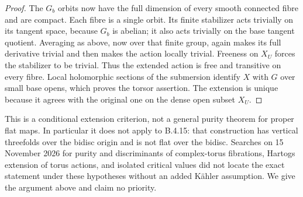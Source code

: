 \begin{proof}
The $G_b$ orbits now have the full dimension of every smooth
connected fibre and are compact.  Each fibre is a single
orbit.  Its finite stabilizer acts trivially on its tangent
space, because $G_b$ is abelian; it also acts trivially on
the base tangent quotient.  Averaging as above, now over
that finite group, again makes its full derivative trivial
and then makes the action locally trivial.  Freeness on
$X_U$ forces the stabilizer to be trivial.  Thus the extended
action is free and transitive on every fibre.  Local
holomorphic sections of the submersion identify $X$ with
$G$ over small base opens, which proves the torsor assertion.
The extension is unique because it agrees with the original
one on the dense open subset $X_U$.
\end{proof}

\begin{remark}
This is a conditional extension criterion, not a general
purity theorem for proper flat maps.  In particular it does
not apply to B.4.15: that construction has vertical
threefolds over the bidisc origin and is not flat over the
bidisc.  Searches on 15 November 2026 for purity and
discriminants of complex-torus fibrations, Hartogs extension
of torus actions, and isolated critical values did not
locate the exact statement under these hypotheses without
an added K\"ahler assumption.  We give the argument above
and claim no priority.
\end{remark}
